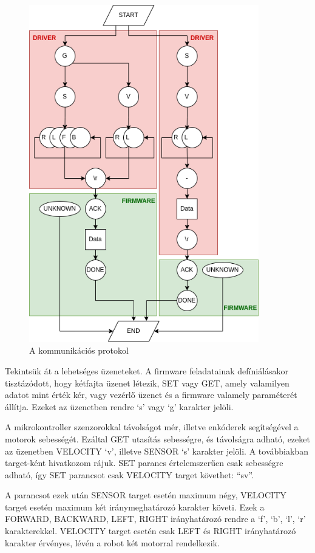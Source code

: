 \begin{figure}
  \centering
  \includegraphics[width=100mm, keepaspectratio]{figures/ch3/protocol.png}
  \caption{A kommunikációs protokol}
  \label{fig:protocol}
\end{figure}

Tekintsük át a lehetséges üzeneteket. A firmware feladatainak defíniálásakor
tisztázódott, hogy kétfajta üzenet létezik, SET vagy GET, amely valamilyen
adatot mint érték kér, vagy vezérlő üzenet és a firmware valamely paraméterét
állítja. Ezeket az üzenetben rendre `s' vagy `g' karakter jelöli.

A mikrokontroller szenzorokkal távolságot mér, illetve enkóderek segítségével a
motorok sebességét. Ezáltal GET utasítás sebességre, és távolságra adható, ezeket
az üzenetben VELOCITY `v', illetve SENSOR `s' karakter jelöli. A továbbiakban
target-ként hivatkozom rájuk. SET parancs
értelemszerűen csak sebességre adható, így SET parancsot csak VELOCITY target
követhet: ``sv''.

A parancsot ezek után SENSOR target esetén maximum négy, VELOCITY target esetén
maximum két iránymeghatározó karakter követi. Ezek a FORWARD, BACKWARD, LEFT,
RIGHT irányhatározó rendre a `f', `b', `l', `r' karakterekkel. VELOCITY target
esetén csak LEFT és RIGHT irányhatározó karakter érvényes, lévén a robot két
motorral rendelkezik. 

